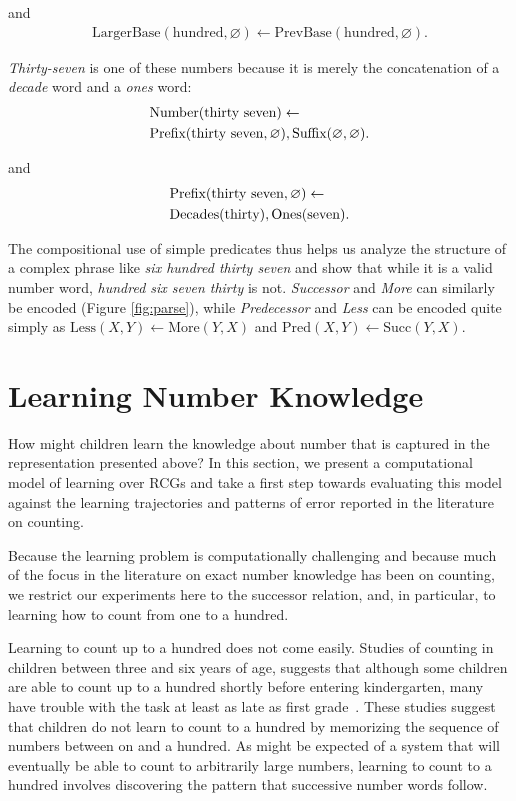 \documentclass[10pt,letterpaper]{article}
\begin{document}
\noindent and
\begin{align}
  \text{LargerBase}(\text{hundred}, \varnothing) \leftarrow \text{PrevBase}(\text{hundred}, \varnothing).
\end{align}

\noindent\emph{Thirty-seven} is one of these numbers because it is
merely the concatenation of a \emph{decade} word and a \emph{ones}
word:
\begin{align}
  & \text{Number}(\text{thirty seven}) \leftarrow\\
  & \text{Prefix}(\text{thirty seven}, \varnothing), \text{Suffix}(\varnothing,\varnothing).\notag
\end{align}

\noindent and
\begin{align}
  & \text{Prefix}(\text{thirty seven}, \varnothing) \leftarrow\\
  & \text{Decades}(\text{thirty}), \text{Ones}(\text{seven}).\notag
\end{align}


\noindent The compositional use of simple predicates thus helps us
analyze the structure of a complex phrase like \emph{six hundred
  thirty seven} and show that while it is a valid number word,
\emph{hundred six seven thirty} is not. \emph{Successor} and
\emph{More} can similarly be encoded (Figure \ref{fig:parse}), while
\emph{Predecessor} and \emph{Less} can be encoded quite simply as
$\text{Less}(X,Y) \leftarrow \text{More}(Y,X)$ and $\text{Pred}(X,Y)
\leftarrow \text{Succ}(Y,X)$.

\section{Learning Number Knowledge}

How might children learn the knowledge about number that is captured
in the representation presented above? In this section, we present a
computational model of learning over RCGs and take a first step
towards evaluating this model against the learning trajectories and
patterns of error reported in the literature on counting. 

Because the learning problem is computationally challenging and
because much of the focus in the literature on exact number knowledge
has been on counting, we restrict our experiments here to the
successor relation, and, in particular, to learning how to count from
one to a hundred.

Learning to count up to a hundred does not come easily. Studies of
counting in children between three and six years of age, suggests that
although some children are able to count up to a hundred shortly
before entering kindergarten, many have trouble with the task at least
as late as first
grade~\cite{FusRicBriar1982,miller1987counting}. These studies suggest
that children do not learn to count to a hundred by memorizing the
sequence of numbers between on and a hundred. As might be expected of
a system that will eventually be able to count to arbitrarily large
numbers, learning to count to a hundred involves discovering the
pattern that successive number words follow. 
\end{document}
